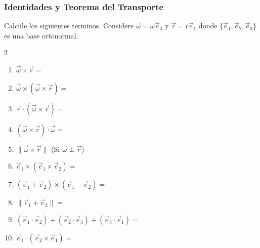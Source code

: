 \subsubsection{Identidades y Teorema del Transporte}
Calcule los siguientes terminos. Considere $\vec{\omega} = \omega\vec{e}_3$ y $\vec{r} = r\vec{e}_1$ donde $\{\vec{e}_1,\vec{e}_2,\vec{e}_3\}$ es una base ortonormal.

\begin{multicols}{2}
\begin{enumerate}
    \item $\vec{\omega} \times \vec{r} =$
    \item $\vec{\omega} \times (\vec{\omega} \times \vec{r}) =$
    \item $\vec{r} \cdot (\vec{\omega} \times \vec{r}) =$
    \item $(\vec{\omega} \times \vec{r}) \cdot \vec{\omega} =$
    \item $\| \vec{\omega} \times \vec{r} \|$ (Si $\vec{\omega} \perp \vec{r}$)
    \item $\vec{e}_1 \times (\vec{e}_1 \times \vec{e}_2) =$
    \item $(\vec{e}_1 + \vec{e}_2) \times (\vec{e}_1 - \vec{e}_2) =$
    \item $\| \vec{e}_1 + \vec{e}_2 \| =$
    \item $(\vec{e}_1 \cdot \vec{e}_2) + (\vec{e}_2 \cdot \vec{e}_3) + (\vec{e}_3 \cdot \vec{e}_1) =$
    \item $\vec{e}_1 \cdot (\vec{e}_2 \times \vec{e}_1) =$
\end{enumerate}
\end{multicols}
